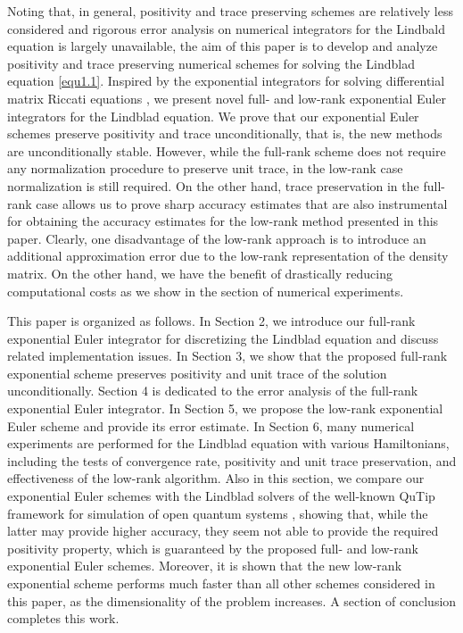 \documentclass[preprint,3p,compress,12pt]{elsarticle}
\numberwithin{equation}{section}
\numberwithin{figure}{section}
\begin{document}
Noting that, in general, positivity and trace preserving schemes are relatively less considered and rigorous error analysis on numerical integrators for the Lindbald equation is largely unavailable, the aim of this paper is to develop and analyze positivity and trace preserving numerical schemes for solving the Lindblad equation \eqref{equ1.1}. Inspired by the exponential integrators for solving differential matrix Riccati equations \cite{Chen1,Chen2}, we present novel full- and low-rank exponential Euler integrators for the Lindblad equation. We prove that our exponential Euler schemes preserve positivity and trace unconditionally, that is, the new methods are unconditionally stable. However, while the full-rank scheme
does not require any normalization procedure to preserve unit trace, in the low-rank
case normalization is still required. On the other hand, trace preservation
in the full-rank case allows us to prove sharp accuracy estimates that
are also instrumental for obtaining the accuracy estimates for the low-rank
method presented in this paper. Clearly, one disadvantage of the low-rank approach
is to introduce an additional approximation error due to the low-rank representation
of the density matrix. On the other hand, we have the benefit of drastically reducing computational costs as we show in the section of numerical experiments.

This paper is organized as follows. In Section 2, we introduce our full-rank exponential Euler integrator for discretizing the Lindblad equation and discuss related implementation issues. In Section 3, we show that the proposed full-rank exponential scheme preserves positivity and unit trace of the solution unconditionally. Section 4 is dedicated to the error analysis of the full-rank exponential Euler integrator. In Section 5, we propose the low-rank exponential Euler scheme and provide its error estimate. In Section 6, many numerical experiments are performed for the Lindblad equation with various Hamiltonians, including the tests of convergence rate, positivity and unit trace preservation, and effectiveness of the low-rank algorithm. Also in this section,
we compare our exponential Euler schemes with the Lindblad solvers of the
well-known QuTip framework for simulation of open quantum systems \cite{Johansson}, showing that, while the latter may provide higher accuracy, they seem not able
to provide the required positivity property, which is guaranteed by the proposed
full- and low-rank exponential Euler schemes. Moreover, it is shown that
the new low-rank exponential scheme performs much faster than
all other schemes considered in this paper, as the dimensionality of the problem increases.
A section of conclusion completes this work.
\end{document}
